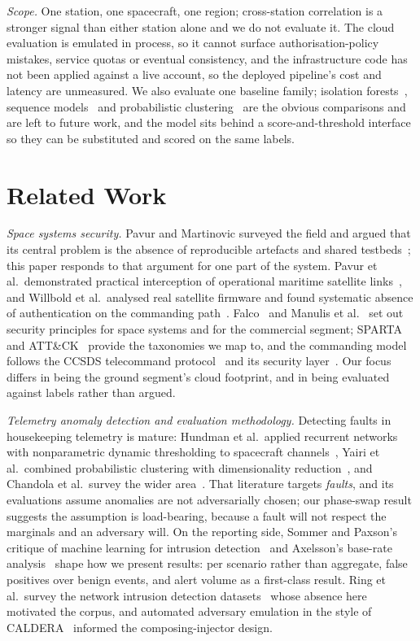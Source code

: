 \documentclass[10pt,journal]{IEEEtran}
\begin{document}
\emph{Scope.} One station, one spacecraft, one region; cross-station
correlation is a stronger signal than either station alone and we do not
evaluate it. The cloud evaluation is emulated in process, so it cannot surface
authorisation-policy mistakes, service quotas or eventual consistency, and the
infrastructure code has not been applied against a live account, so the
deployed pipeline's cost and latency are unmeasured. We also evaluate one
baseline family; isolation forests~\cite{liu2008isolation}, sequence
models~\cite{hundman2018lstm} and probabilistic
clustering~\cite{yairi2017datadriven} are the obvious comparisons and are left
to future work, and the model sits behind a score-and-threshold interface so
they can be substituted and scored on the same labels.

\section{Related Work}

\emph{Space systems security.} Pavur and Martinovic surveyed the field and
argued that its central problem is the absence of reproducible artefacts and
shared testbeds~\cite{pavur2020sok}; this paper responds to that argument for
one part of the system. Pavur et al.\ demonstrated practical interception of
operational maritime satellite links~\cite{pavur2020vsat}, and Willbold et al.\
analysed real satellite firmware and found systematic absence of authentication
on the commanding path~\cite{willbold2023space}.
Falco~\cite{falco2019principles} and Manulis et
al.~\cite{manulis2021newspace} set out security principles for space systems
and for the commercial segment; SPARTA~\cite{sparta} and ATT\&CK~\cite{attack}
provide the taxonomies we map to, and the commanding model follows the CCSDS
telecommand protocol~\cite{ccsds232} and its security layer~\cite{ccsds355}.
Our focus differs in being the ground segment's cloud footprint, and in being
evaluated against labels rather than argued.

\emph{Telemetry anomaly detection and evaluation methodology.} Detecting faults
in housekeeping telemetry is mature: Hundman et al.\ applied recurrent networks
with nonparametric dynamic thresholding to spacecraft
channels~\cite{hundman2018lstm}, Yairi et al.\ combined probabilistic
clustering with dimensionality reduction~\cite{yairi2017datadriven}, and
Chandola et al.\ survey the wider area~\cite{chandola2009survey}. That
literature targets \emph{faults}, and its evaluations assume anomalies are not
adversarially chosen; our phase-swap result suggests the assumption is
load-bearing, because a fault will not respect the marginals and an adversary
will. On the reporting side, Sommer and Paxson's critique of machine learning
for intrusion detection~\cite{sommer2010closedworld} and Axelsson's base-rate
analysis~\cite{axelsson2000baserate} shape how we present results: per
scenario rather than aggregate, false positives over benign events, and alert
volume as a first-class result. Ring et al.\ survey the network intrusion
detection datasets~\cite{ring2019datasets} whose absence here motivated the
corpus, and automated adversary emulation in the style of
CALDERA~\cite{applebaum2016caldera} informed the composing-injector design.
\end{document}
